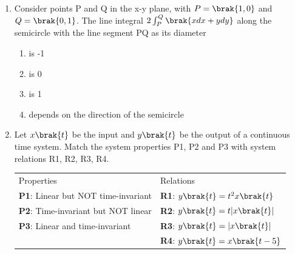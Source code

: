 \documentclass[a4paper, 11pt]{article}
\begin{document}
\begin{enumerate}
    \begin{enumerate}
    \end{enumerate}
    
    \hfill{}

    \item Consider points P and Q in the x-y plane, with $P=\brak{1,0}$ and $Q=\brak{0,1}$. The line integral $2\int_{P}^{Q}\brak{xdx+ydy}$ along the semicircle with the line segment PQ as its diameter
    \begin{enumerate}
            \item is -1
            \item is 0
            \item is 1\textbf{}
            \item depends on the direction  of the semicircle
    \end{enumerate}
    
    \hfill{}

    \item Let $x\brak{t}$ be the input and $y\brak{t}$ be the output of a continuous time system. Match the system properties P1, P2 and P3 with system relations R1, R2, R3, R4.\\
    \begin{tabular}{ll}
        Properties & Relations\\
        \textbf{P1}: Linear but NOT time-invariant & \textbf{R1}: $y\brak{t}=t^2x\brak{t}$ \\
        \textbf{P2}: Time-invariant but NOT linear & \textbf{R2}: $y\brak{t}=t|x\brak{t}|$ \\
        \textbf{P3}: Linear and time-invariant & \textbf{R3}: $y\brak{t}=|x\brak{t}|$\\
         & \textbf{R4}: $y\brak{t}=x\brak{t-5}$
    \end{tabular}

    
    \begin{enumerate}
    \end{enumerate}
    

\end{enumerate}
\end{document}
